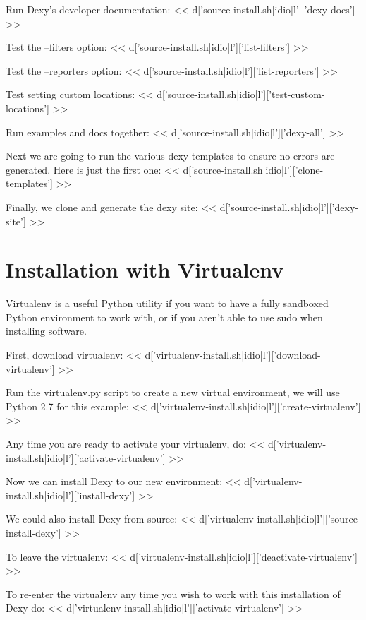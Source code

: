 \documentclass{tufte-handout}
\begin{document}
Run Dexy's developer documentation:
<< d['source-install.sh|idio|l']['dexy-docs'] >>

Test the --filters option:
<< d['source-install.sh|idio|l']['list-filters'] >>

Test the --reporters option:
<< d['source-install.sh|idio|l']['list-reporters'] >>

Test setting custom locations:
<< d['source-install.sh|idio|l']['test-custom-locations'] >>

Run examples and docs together:
<< d['source-install.sh|idio|l']['dexy-all'] >>

Next we are going to run the various dexy templates to ensure no errors are generated. Here is just the first one:
<< d['source-install.sh|idio|l']['clone-templates'] >>

Finally, we clone and generate the dexy site:
<< d['source-install.sh|idio|l']['dexy-site'] >>

\section{Installation with Virtualenv}

Virtualenv is a useful Python utility if you want to have a fully sandboxed Python environment to work with, or if you aren't able to use sudo when installing software.

First, download virtualenv:
<< d['virtualenv-install.sh|idio|l']['download-virtualenv'] >>

Run the virtualenv.py script to create a new virtual environment, we will use Python 2.7 for this example:
<< d['virtualenv-install.sh|idio|l']['create-virtualenv'] >>

Any time you are ready to activate your virtualenv, do:
<< d['virtualenv-install.sh|idio|l']['activate-virtualenv'] >>

Now we can install Dexy to our new environment:
<< d['virtualenv-install.sh|idio|l']['install-dexy'] >>

We could also install Dexy from source:
<< d['virtualenv-install.sh|idio|l']['source-install-dexy'] >>

To leave the virtualenv:
<< d['virtualenv-install.sh|idio|l']['deactivate-virtualenv'] >>

To re-enter the virtualenv any time you wish to work with this installation of Dexy do:
<< d['virtualenv-install.sh|idio|l']['activate-virtualenv'] >>
\end{document}
